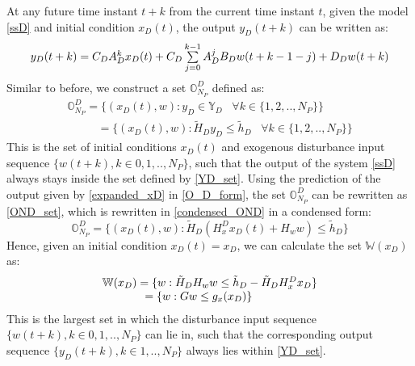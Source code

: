 \documentclass[letterpaper, 10 pt, conference]{ieeeconf}  %
\begin{document}
At any future time instant $t+k$ from the current time instant $t$, given the model \eqref{ssD} and initial condition $x_D(t)$, the output $y_D(t+k)$ can be written as:
\begin{equation}
\small
\begin{matrix}
y_D(t+k)=C_DA_D^{k}x_D(t)+ C_D\sum\limits_{j=0}^{k-1}A_D^jB_Dw(t+k-1-j)+D_Dw(t+k) \\
\end{matrix}
\label{expanded_xD}
\end{equation}
Similar to before, we construct a set $\mathbb{O}^D_{N_P}$ defined as:
  \begin{equation}
  \begin{matrix}
  \mathbb{O}^D_{N_P} = \{(x_D(t),w):y_D\in \mathbb{Y}_D \hspace{10pt} \forall k \in \{1,2,..,N_P\} \}  \\
    \hspace{32pt} = \{(x_D(t),w):\tilde{H}_Dy_D \leq \tilde{h}_D \hspace{10pt} \forall k \in \{1,2,..,N_P\} \} 
  \end{matrix}
  \label{O_D_form}
  \end{equation}
  This is the set of initial conditions $x_D(t)$ and exogenous disturbance input sequence $\{w(t+k),k \in 0, 1, .., N_P\}$, such that the output of the system \eqref{ssD} always stays inside the set defined by \eqref{YD_set}. Using the prediction of the output given by \eqref{expanded_xD} in \eqref{O_D_form}, 
  the set $\mathbb{O}_{N_P}^D$ can be rewritten as \eqref{OND_set}, which is rewritten in \eqref{condensed_OND} in a condensed form:
  \begin{equation}
  \mathbb{O}_{N_P}^D=\{(x_D(t),w): \tilde{H}_D(H_x^Dx_D(t)+H_ww) \leq \tilde{h}_D\}
  \label{condensed_OND}
  \end{equation}
  Hence, given an initial condition $x_D(t)=x_D$, we can calculate the set $\mathbb{W}(x_D)$ as:
  \begin{equation}
  \begin{matrix}
  \mathbb{W}(x_D) = \{w: \tilde{H}_DH_ww \leq \tilde{h}_D-\tilde{H}_DH_x^Dx_D\} \\
  \hspace{-20pt}
   = \{w: Gw \leq g_x(x_D)\}
   \end{matrix}
   \label{w_xd_set}
  \end{equation}
  This is the largest set in which the disturbance input sequence $\{w(t+k),k \in 0,1,..,N_P\}$ can lie in, such that the corresponding output sequence $\{y_D(t+k),k \in 1,..,N_P\}$ always lies within \eqref{YD_set}. 
\end{document}
